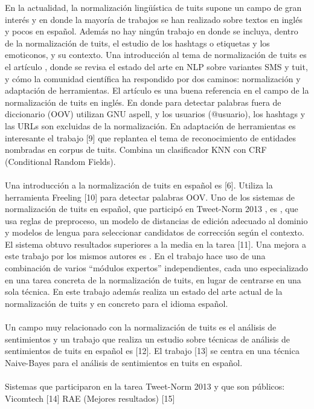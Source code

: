 \documentclass[14pt]{extarticle}
\theoremstyle{definition}
\theoremstyle{remark}
\begin{document}
En la actualidad, la normalización lingüística de tuits \citep{baldwin:2011} supone un campo de gran interés y en donde la mayoría de trabajos se han realizado sobre textos en inglés y pocos en español. Además no hay ningún trabajo en donde se incluya, dentro de la normalización de tuits, el estudio de los hashtags o etiquetas y los emoticonos, y su contexto. 
Una introducción al tema de normalización de tuits es el artículo \citep{eisenstein:2013}, donde se revisa el estado del arte en NLP sobre variantes SMS y tuit, y cómo la comunidad científica ha respondido por dos caminos: normalización y adaptación de herramientas.
El artículo \citep{baldwin:2011} es una buena referencia en el campo de la normalización de tuits en inglés. En donde para detectar palabras fuera de diccionario (OOV) utilizan GNU aspell, y los usuarios (@usuario), los hashtags y las URLs son excluidas de la normalización. En adaptación de herramientas es interesante el trabajo [9] que replantea el tema de reconocimiento de entidades nombradas en corpus de tuits. Combina un clasificador KNN con CRF (Conditional Random Fields).
\\\\
Una introducción a la normalización de tuits en español es \citep{alegria:2013}[6]. Utiliza la herramienta Freeling [10] para detectar palabras OOV. Uno de los sistemas de normalización de tuits en español, que participó en Tweet-Norm 2013 \citep{alegria:2013}, es \citep{ruizcuadros:2013}, que usa reglas de preproceso, un modelo de distancias de edición adecuado al dominio y modelos de lengua para seleccionar candidatos de corrección según el contexto. El sistema obtuvo resultados superiores a la media en la tarea \citep{alegria:2013}[11]. Una mejora a este trabajo por los mismos autores es \citep{ruizcuadros:2014}. En el trabajo \citep{cotelocruz:2015} hace uso de una combinación de varios “módulos expertos” independientes, cada uno especializado en una tarea concreta de la normalización de tuits, en lugar de centrarse en una sola técnica. En este trabajo además realiza un estado del arte actual de la normalización de tuits y en concreto para el idioma español.
\\\\
Un campo muy relacionado con la normalización de tuits es el análisis de sentimientos y un trabajo que realiza un estudio sobre técnicas de análisis de sentimientos de tuits en español es [12]. El trabajo [13] se centra en una técnica Naive-Bayes para el análisis de sentimientos en tuits en español.
\\\\
Sistemas que participaron en la tarea Tweet-Norm 2013 y que son públicos:
Vicomtech \citep{ruizcuadros:2013} \citep{ruizcuadros:2014} [14]
RAE (Mejores resultados) [15]
\end{document}
